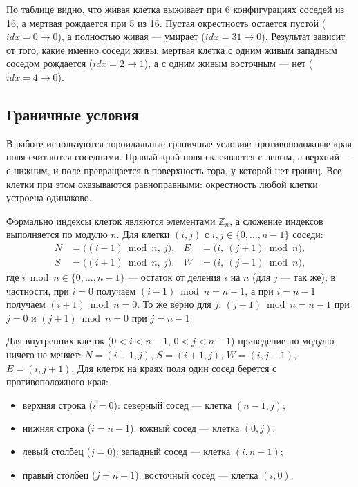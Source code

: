 По таблице видно, что живая клетка выживает при 6 конфигурациях соседей из 16, а мертвая рождается при 5 из 16. Пустая окрестность остается пустой ($idx = 0 \to 0$), а полностью живая --- умирает ($idx = 31 \to 0$). Результат зависит от того, какие именно соседи живы: мертвая клетка с одним живым западным соседом рождается ($idx = 2 \to 1$), а с одним живым восточным --- нет ($idx = 4 \to 0$).

\subsection{Граничные условия}
\label{sec:torus}

В работе используются тороидальные граничные условия: противоположные края поля считаются соседними. Правый край поля склеивается с левым, а верхний --- с нижним, и поле превращается в поверхность тора, у которой нет границ. Все клетки при этом оказываются равноправными: окрестность любой клетки устроена одинаково.

Формально индексы клеток являются элементами $\mathbb{Z}_n$, а сложение индексов выполняется по модулю $n$. Для клетки $(i, j)$ с $i, j \in \{0, \dots, n-1\}$ соседи:
\begin{align*}
	N &= \bigl((i-1) \bmod n,\ j\bigr), & E &= \bigl(i,\ (j+1) \bmod n\bigr),\\
	S &= \bigl((i+1) \bmod n,\ j\bigr), & W &= \bigl(i,\ (j-1) \bmod n\bigr),
\end{align*}
где $i \bmod n \in \{0, \dots, n-1\}$ --- остаток от деления $i$ на $n$ (для $j$ --- так же); в частности, при $i = 0$ получаем $(i-1) \bmod n = n-1$, а при $i = n-1$ получаем $(i+1) \bmod n = 0$. То же верно для $j$: $(j-1) \bmod n = n-1$ при $j = 0$ и $(j+1) \bmod n = 0$ при $j = n-1$.

Для внутренних клеток ($0 < i < n-1$, $0 < j < n-1$) приведение по модулю ничего не меняет: $N = (i-1, j)$, $S = (i+1, j)$, $W = (i, j-1)$, $E = (i, j+1)$. Для клеток на краях поля один сосед берется с противоположного края:
\begin{itemize}
	\item верхняя строка ($i = 0$): северный сосед --- клетка $(n-1, j)$;
	\item нижняя строка ($i = n-1$): южный сосед --- клетка $(0, j)$;
	\item левый столбец ($j = 0$): западный сосед --- клетка $(i, n-1)$;
	\item правый столбец ($j = n-1$): восточный сосед --- клетка $(i, 0)$.
\end{itemize}


